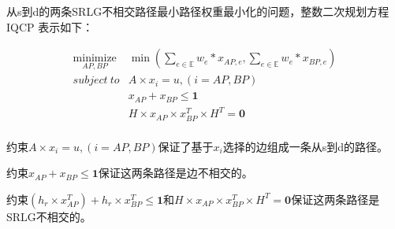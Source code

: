 从s到d的两条SRLG不相交路径最小路径权重最小化的问题，整数二次规划方程IQCP 表示如下：

\begin{equation}
\begin{array}{*{20}{c}}
   {\mathop {minimize}\limits_{AP,BP} } & {\min \left( {{\sum\limits_{e\in \mathbb{E}}w_e*x_{AP,e}},{\sum\limits_{e\in \mathbb{E}}w_e*x_{BP,e}}} \right)}  \\
   {subject\ to} & A\times x_i=u,(i=AP,BP) \\
   {} & x_{AP}+x_{BP}\leq \textbf{1}\\
   {} & H\times x_{AP}\times x_{BP}^T\times H^T = \textbf{0}\\
\end{array}
\label{eq:problem definition}
\end{equation}

约束$A\times x_i=u,(i=AP,BP)$保证了基于$x_i$选择的边组成一条从s到d的路径。

约束$x_{AP}+x_{BP}\leq \textbf{1}$保证这两条路径是边不相交的。

约束$(h_{r}\times x_{AP}^T)+h_{r}\times x_{BP}^T \leq \textbf{1}$和$H\times x_{AP}\times x_{BP}^T\times H^T = \textbf{0}$保证这两条路径是SRLG不相交的。


